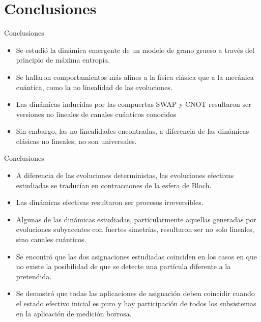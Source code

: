 \section{Conclusiones}

\begin{frame}{Conclusiones}
    \begin{itemize}
        \item Se estudió la dinámica emergente de un modelo de grano grueso a través del principio de máxima entropía.
        \item Se hallaron comportamientos más afines a la física clásica que a la mecánica cuántica, como la no linealidad de las evoluciones.
        \item Las dinámicas inducidas por las compuertas SWAP y CNOT resultaron ser versiones no lineales de canales cuánticos conocidos
        \item Sin embargo, las no linealidades encontradas, a diferencia de las dinámicas clásicas no lineales, no son universales.
    \end{itemize}
\end{frame}

\begin{frame}{Conclusiones}
    \begin{itemize}
        \item A diferencia de las evoluciones deterministas, las evoluciones efectivas estudiadas se traducían en contracciones de la esfera de Bloch.
        \item Las dinámicas efectivas resultaron ser procesos irreversibles.
        \item Algunas de las dinámicas estudiadas, particularmente aquellas generadas por evoluciones subyacentes con fuertes simetrías, resultaron ser no solo lineales, sino canales cuánticos.
    \end{itemize}
\end{frame}

\begin{frame}
    \begin{itemize}
        \item Se encontró que las dos asignaciones estudiadas coinciden en los casos en que no existe la posibilidad de que se detecte una partícula diferente a la pretendida. 
        \item Se demostró que todas las aplicaciones de asignación deben coincidir cuando el estado efectivo inicial es puro y hay participación de todos los subsistemas en la aplicación de medición borrosa.
    \end{itemize}
\end{frame}

